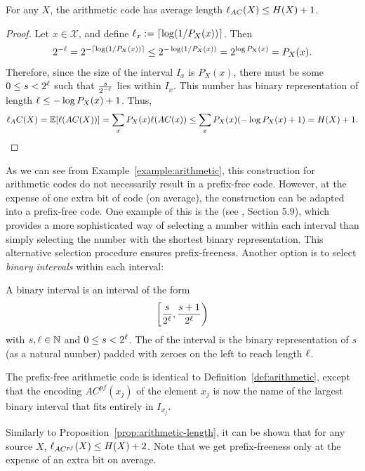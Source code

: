 \begin{example}
\end{example}


\begin{proposition}\label{prop:arithmetic-length}
For any $X$, the arithmetic code has average length $\ell_{AC}(X) \leq H(X) + 1$.
\end{proposition}
\begin{proof}
Let $x \in \mathcal{X}$, and define $\ell_x := \lceil \log (1/P_X(x))\rceil$. Then
\begin{align}
2^{-\ell} = 2^{-\lceil \log (1/P_X(x))\rceil} \leq 2^{-\log (1/P_X(x))} = 2^{\log P_X(x)} = P_X(x).
\end{align}
Therefore, since the size of the interval $I_x$ is $P_X(x)$, there must be some $0 \leq s < 2^\ell$ such that $\frac{s}{2^{-\ell}}$ lies within $I_x$. This number has binary representation of length $\ell \leq -\log P_X(x) + 1$. Thus,
\begin{align}
\ell_AC(X) = \mathbb{E}[\ell(AC(X))] = \sum_x P_X(x) \ell(AC(x)) \leq \sum_x P_X(x) (-\log P_X(x) + 1) = H(X) + 1.
\end{align}
\end{proof}

As we can see from Example~\ref{example:arithmetic}, this construction for arithmetic codes do not necessarily result in a prefix-free code. However, at the expense of one extra bit of code (on average), the construction can be adapted into a prefix-free code. One example of this is the  (see \CT, Section 5.9), which provides a more sophisticated way of selecting a number within each interval than simply selecting the number with the shortest binary representation. This alternative selection procedure ensures prefix-freeness. Another option is to select \emph{binary intervals} within each interval:

\begin{definition}
A binary interval is an interval of the form
\[
\left[\frac{s}{2^{\ell}}, \frac{s+1}{2^{\ell}}\right)
\]
with $s, \ell \in \mathbb{N}$ and $0 \leq s < 2^{\ell}$. The  of the interval is the binary representation of $s$ (as a natural number) padded with zeroes on the left to reach length $\ell$.
\end{definition}

\begin{definition}
The prefix-free arithmetic code is identical to Definition~\ref{def:arithmetic}, except that the encoding $AC^{pf}(x_j)$ of the element $x_j$ is now the name of the largest binary interval that fits entirely in $I_{x_j}$.
\end{definition}
Similarly to Proposition~\ref{prop:arithmetic-length}, it can be shown that for any source  $X$, $\ell_{AC^{pf}}(X) \leq H(X) + 2$. Note that we get prefix-freeness only at the expense of an extra bit on average.

